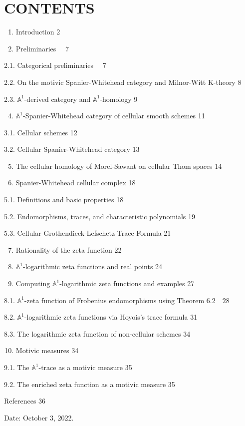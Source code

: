 \documentclass[10pt]{article}
\begin{document}
\section{CONTENTS}
\begin{enumerate}
  \item Introduction 2

  \item Preliminaries $\quad 7$

\end{enumerate}
2.1. Categorical preliminaries $\quad 7$

2.2. On the motivic Spanier-Whitehead category and Milnor-Witt K-theory 8

2.3. $\mathbb{A}^{1}$-derived category and $\mathbb{A}^{1}$-homology 9

\begin{enumerate}
  \setcounter{enumi}{3}
  \item $\mathbb{A}^{1}$-Spanier-Whitehead category of cellular smooth schemes 11
\end{enumerate}
3.1. Cellular schemes 12

3.2. Cellular Spanier-Whitehead category 13

\begin{enumerate}
  \setcounter{enumi}{4}
  \item The cellular homology of Morel-Sawant on cellular Thom spaces 14

  \item Spanier-Whitehead cellular complex 18

\end{enumerate}
5.1. Definitions and basic properties 18

5.2. Endomorphisms, traces, and characteristic polynomials 19

5.3. Cellular Grothendieck-Lefschetz Trace Formula 21

\begin{enumerate}
  \setcounter{enumi}{6}
  \item Rationality of the zeta function 22

  \item $\mathbb{A}^{1}$-logarithmic zeta functions and real points 24

  \item Computing $\mathbb{A}^{1}$-logarithmic zeta functions and examples 27

\end{enumerate}
8.1. $\mathbb{A}^{1}$-zeta function of Frobenius endomorphisms using Theorem $6.2 \quad 28$

8.2. $\mathbb{A}^{1}$-logarithmic zeta functions via Hoyois's trace formula 31

8.3. The logarithmic zeta function of non-cellular schemes 34

\begin{enumerate}
  \setcounter{enumi}{9}
  \item Motivic measures 34
\end{enumerate}
9.1. The $\mathbb{A}^{1}$-trace as a motivic measure 35

9.2. The enriched zeta function as a motivic measure 35

References 36

Date: October 3, 2022.
\end{document}
